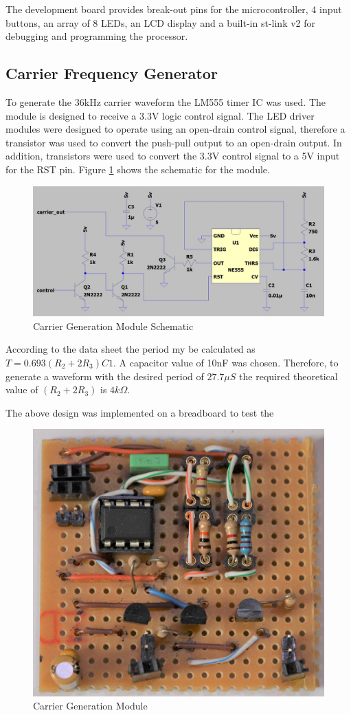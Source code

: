 The development board provides break-out pins for the microcontroller, 4 input buttons, an array of 8 LEDs, an LCD display and a built-in st-link v2 for debugging and programming the processor. 


\subsection{Carrier Frequency Generator}
To generate the 36kHz carrier waveform the LM555 timer IC was used. The module is designed to receive a 3.3V logic control signal. The LED driver modules were designed to operate using an open-drain control signal, therefore a transistor was used to convert the push-pull output to an open-drain output. In addition, transistors were used to convert the 3.3V control signal to a 5V input for the RST pin. Figure \ref{fig:schematic_carrier_generation} shows the schematic for the module.


\begin{figure}[H]
	\centering
	\includegraphics[width=.8\textwidth]{figures/design/carrier_waveform_generator_555.JPG}
	\caption{Carrier Generation Module Schematic}
	\label{fig:schematic_carrier_generation}
\end{figure}

According to the data sheet the period my be calculated as \(T = 0.693 (R_2 + 2R_3) C1\). A capacitor value of 10nF was chosen. Therefore, to generate a waveform with the desired period of $27.7\mu S$ the required theoretical value of $(R_2 + 2R_3)$ is $4k\Omega$.

The above design was implemented on a breadboard to test the


\begin{figure}[H]
	\centering
	\includegraphics[width=.6\textwidth]{figures/modules/carrier_generator.jpg}
	\caption{Carrier Generation Module}
	\label{fig:module_carrier_generation}
\end{figure}

